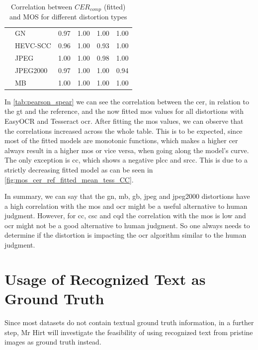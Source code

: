 \begin{table}[h]
\begin{tabular}{llrrrr}
                 & GN &            0.97 &  1.00 &  1.00 &  1.00 \\
                 & HEVC-SCC &            0.96 &  1.00 &  0.93 &  1.00 \\
                 & JPEG &            1.00 &  1.00 &  0.98 &  1.00 \\
                 & JPEG2000 &            0.97 &  1.00 &  1.00 &  0.94 \\
                 & MB &            1.00 &  1.00 &  1.00 &  1.00 \\
\bottomrule
\end{tabular}
    \caption{Correlation between $CER_{comp}$ (fitted) and MOS for different distortion types}
\label{tab:pearson_spear_fitted}
\end{table}

In \autoref{tab:pearson_spear} we can see the correlation between the \gls{cer}, in relation to the \gls{gt} and the reference, and the now fitted \gls{mos} values for all distortions with EasyOCR and Tesseract \gls{ocr}.
After fitting the \gls{mos} values, we can observe that the correlations increased across the whole table.
This is to be expected, since most of the fitted models are monotonic functions, which makes a higher \gls{cer} always result in a higher \gls{mos} or vice versa, when going along the model's curve.
The only exception is \gls{cc}, which shows a negative \gls{plcc} and \gls{srcc}.
This is due to a strictly decreasing fitted model as can be seen in \autoref{fig:mos_cer_ref_fitted_mean_tess_CC}.

In summary, we can say that the \gls{gn}, \gls{mb}, \gls{gb}, \gls{jpeg} and \gls{jpeg2000} distortions have a high correlation with the \gls{mos} and \gls{ocr} might be a useful alternative to human judgment.
However, for \gls{cc}, \gls{csc} and \gls{cqd} the correlation with the \gls{mos} is low and \gls{ocr} might not be a good alternative to human judgment.
So one always needs to determine if the distortion is impacting the \gls{ocr} algorithm similar to the human judgment.

    
\section{Usage of Recognized Text as Ground Truth}
\label{sec:usage_of_recognized_text_as_ground_truth}

Since most datasets do not contain textual ground truth information,
in a further step, Mr Hirt will investigate the feasibility of
using recognized text from pristine images as ground truth instead.

